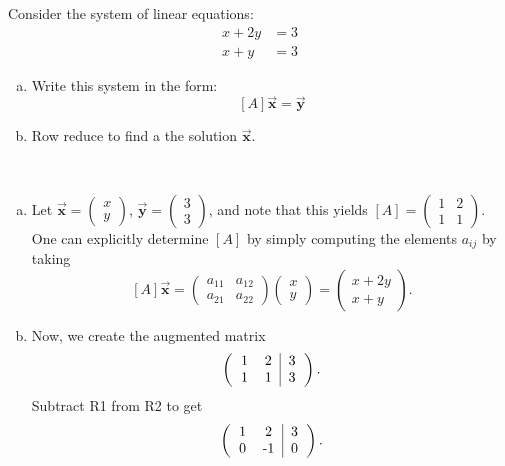 \documentclass[12pt]{article} %
\begin{document}
\newpage
\begin{problem} 
Consider the system of linear equations:
\begin{align*}
    x + 2y &= 3\\
    x + y  &= 3
\end{align*}
\begin{enumerate}[(a)]
    \item Write this system in the form:
    \[
    [A]\vec{\boldsymbol{x}} = \vec{\boldsymbol{y}}
    \]
    \item Row reduce to find a the solution $\vec{\boldsymbol{x}}$.
\end{enumerate}
\end{problem}
\begin{solution}~
   \begin{enumerate}[(a)]
        \item Let $\vec{\boldsymbol{x}} = \begin{pmatrix} x \\ y \end{pmatrix}$, $\vec{\boldsymbol{y}} = \begin{pmatrix} 3 \\ 3 \end{pmatrix}$, and note that this yields $[A] = \begin{pmatrix} 1 & 2 \\ 1 & 1 \end{pmatrix}$. One can explicitly determine $[A]$ by simply computing the elements $a_{ij}$ by taking
        \[
        [A]\vec{\boldsymbol{x}} = \begin{pmatrix} a_{11} & a_{12} \\ a_{21} & a_{22} \end{pmatrix} \begin{pmatrix} x \\ y \end{pmatrix} = \begin{pmatrix} x + 2y \\ x + y \end{pmatrix}.
        \]  
        \item Now, we create the augmented matrix
        \[
        \left( \begin{tabular} {cc | c} 1 & 2 & 3 \\ 1 & 1 & 3 \end{tabular} \right).
        \]  
        Subtract R1 from R2 to get
        \[
        \left( \begin{tabular} {cc | c} 1 & 2 & 3 \\ 0 & -1 & 0 \end{tabular} \right).
\]
\end{enumerate}
\end{solution}
\end{document}

